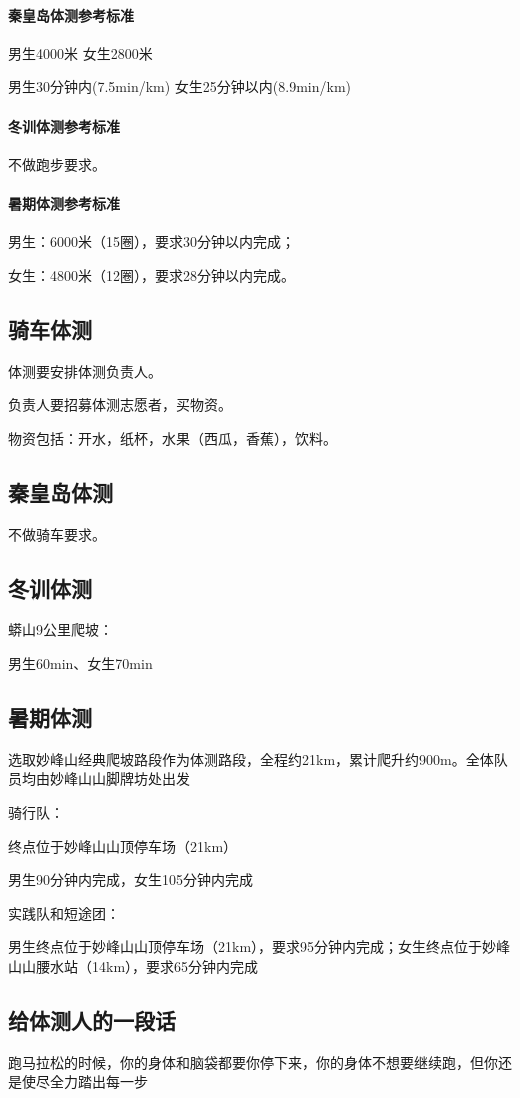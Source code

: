 \documentclass{ctexbook}
\begin{document}
\paragraph{秦皇岛体测参考标准}

男生4000米 女生2800米

男生30分钟内(7.5min/km) 女生25分钟以内(8.9min/km)
\paragraph{冬训体测参考标准}
不做跑步要求。
\paragraph{暑期体测参考标准}
男生：6000米（15圈），要求30分钟以内完成；

女生：4800米（12圈），要求28分钟以内完成。


\subsection{骑车体测}

体测要安排体测负责人。

负责人要招募体测志愿者，买物资。

物资包括：开水，纸杯，水果（西瓜，香蕉），饮料。

\subsection{秦皇岛体测}
不做骑车要求。
\subsection{冬训体测}
蟒山9公里爬坡：

男生60min、女生70min
\subsection{暑期体测}
选取妙峰山经典爬坡路段作为体测路段，全程约21km，累计爬升约900m。全体队员均由妙峰山山脚牌坊处出发

骑行队：

终点位于妙峰山山顶停车场（21km）

男生90分钟内完成，女生105分钟内完成

实践队和短途团：

男生终点位于妙峰山山顶停车场（21km），要求95分钟内完成；女生终点位于妙峰山山腰水站（14km），要求65分钟内完成
\subsection{给体测人的一段话}
跑马拉松的时候，你的身体和脑袋都要你停下来，你的身体不想要继续跑，但你还是使尽全力踏出每一步
\end{document}
